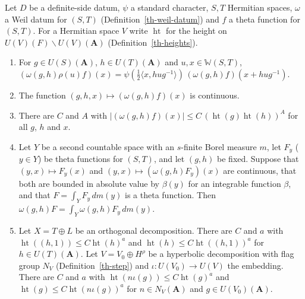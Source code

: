 \begin{lemma}\label{th-weil-estimates}
Let $D$ be a definite-side datum, $\psi$ a standard character, $S,T$
Hermitian spaces, $\omega$ a Weil datum for $(S,T)$
(Definition~\ref{th-weil-datum}) and $f$ a theta function for $(S,T)$. For a
Hermitian space $V$ write $\operatorname{ht}$ for the height on
$U(V)(F)\backslash U(V)(\mathbf A)$ (Definition~\ref{th-heights}).
\begin{enumerate}
\item For $g\in U(S)(\mathbf A)$, $h\in U(T)(\mathbf A)$ and
  $u,x\in\mathbb W(S,T)$,
  $(\omega(g,h)\rho(u)f)(x)=\psi(\tfrac12\langle x,hug^{-1}\rangle)\,(\omega(g,h)f)(x+hug^{-1})$.
\item The function $(g,h,x)\mapsto(\omega(g,h)f)(x)$ is continuous.
\item There are $C$ and $A$ with
  $|(\omega(g,h)f)(x)|\leq C\,(\operatorname{ht}(g)\operatorname{ht}(h))^A$ for
  all $g$, $h$ and $x$.
\item Let $Y$ be a second countable space with an $s$-finite Borel measure $m$,
  let $F_y$ ($y\in Y$) be theta functions for $(S,T)$, and let $(g,h)$ be
  fixed. Suppose that $(y,x)\mapsto F_y(x)$ and
  $(y,x)\mapsto(\omega(g,h)F_y)(x)$ are continuous, that both are bounded in
  absolute value by $\beta(y)$ for an integrable function $\beta$, and that
  $F=\int_YF_y\,dm(y)$ is a theta function. Then
  $\omega(g,h)F=\int_Y\omega(g,h)F_y\,dm(y)$.
\item Let $X=T\oplus L$ be an orthogonal decomposition. There are $C$ and $a$
  with $\operatorname{ht}((h,1))\leq C\operatorname{ht}(h)^a$ and
  $\operatorname{ht}(h)\leq C\operatorname{ht}((h,1))^a$ for
  $h\in U(T)(\mathbf A)$. Let $V=V_0\oplus H^\rho$ be a hyperbolic decomposition
  with flag group $N_V$ (Definition~\ref{th-step}) and
  $\iota\colon U(V_0)\to U(V)$ the embedding. There are $C$ and $a$ with
  $\operatorname{ht}(n\iota(g))\leq C\operatorname{ht}(g)^a$ and
  $\operatorname{ht}(g)\leq C\operatorname{ht}(n\iota(g))^a$ for
  $n\in N_V(\mathbf A)$ and $g\in U(V_0)(\mathbf A)$.
\end{enumerate}
\end{lemma}
